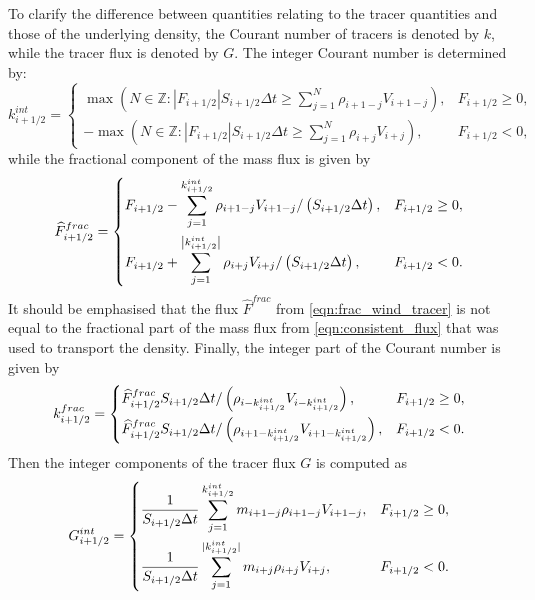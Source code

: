 \documentclass[11pt,a4paper]{article}
\begin{document}
To clarify the difference between quantities relating to the tracer quantities and those of the underlying density,
the Courant number of tracers is denoted by $k$, while the tracer flux is denoted by $G$.
The integer Courant number is determined by:
\begin{equation} \label{eqn:int_courant_tracer}
k^{int}_{i+1/2} = 
\begin{cases}
\max\left(N\in\mathbb{Z} : |F_{i+1/2}|S_{i+1/2} \Delta t \geq\sum_{j=1}^N \rho_{i+1-j} V_{i+1-j} \right), & F_{i+1/2} \geq 0, \\
-\max\left(N\in\mathbb{Z} : |F_{i+1/2}|S_{i+1/2} \Delta t \geq\sum_{j=1}^N \rho_{i+j} V_{i+j} \right), & F_{i+1/2} < 0,
\end{cases}
\end{equation}
while the fractional component of the mass flux is given by
\begin{equation} \label{eqn:frac_wind_tracer}
\widehat{F}^{frac}_{i+1/2} = 
\begin{dcases}
F_{i+1/2}-\sum_{j=1}^{k^{int}_{i+1/2}} \rho_{i+1-j} V_{i+1-j} / \left(S_{i+1/2}\Delta t\right), & F_{i+1/2} \geq 0, \\
F_{i+1/2}+\sum_{j=1}^{\left|k^{int}_{i+1/2}\right|} \rho_{i+j} V_{i+j} / \left(S_{i+1/2}\Delta t\right), & F_{i+1/2} < 0.
\end{dcases}
\end{equation}
It should be emphasised that the flux $\widehat{F}^{frac}$ from \eqref{eqn:frac_wind_tracer} is not equal to the fractional part of the mass flux from \eqref{eqn:consistent_flux} that was used to transport the density.
Finally, the integer part of the Courant number is given by
\begin{equation} \label{eqn:frac_courant_tracer}
k^{frac}_{i+1/2} =
\begin{dcases}
\widehat{F}^{frac}_{i+1/2} S_{i+1/2}\Delta t / \left(\rho_{i-k^{int}_{i+1/2}} V_{i-k^{int}_{i+1/2}}\right), & F_{i+1/2} \geq 0, \\
\widehat{F}^{frac}_{i+1/2} S_{i+1/2}\Delta t / \left(\rho_{i+1-k^{int}_{i+1/2}} V_{i+1-k^{int}_{i+1/2}} \right), & F_{i+1/2} < 0.
\end{dcases}
\end{equation}
Then the integer components of the tracer flux $G$ is computed as
\begin{equation}
    G^{int}_{i+1/2} = 
    \begin{dcases}
        \frac{1}{S_{i+1/2}\Delta{t}}\sum_{j=1}^{k_{i+1/2}^{int}} m_{i+1-j} \rho_{i+1-j} V_{i+1-j}, & F_{i+1/2} \geq 0, \\
        \frac{1}{S_{i+1/2}\Delta{t}}\sum_{j=1}^{|k_{i+1/2}^{int}|} m_{i+j} \rho_{i+j} V_{i+j}, & F_{i+1/2} < 0.
    \end{dcases}
\end{equation}
\end{document}
